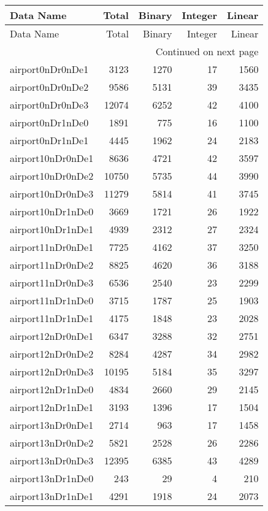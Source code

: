 \begin{longtable}{lrrrr}
\toprule
Data Name & Total & Binary & Integer & Linear \\
\midrule
\endfirsthead
\toprule
Data Name & Total & Binary & Integer & Linear \\
\midrule
\endhead
\midrule
\multicolumn{5}{r}{Continued on next page} \\
\midrule
\endfoot
\bottomrule
\endlastfoot
airport0nDr0nDe1 & 3123 & 1270 & 17 & 1560 \\
airport0nDr0nDe2 & 9586 & 5131 & 39 & 3435 \\
airport0nDr0nDe3 & 12074 & 6252 & 42 & 4100 \\
airport0nDr1nDe0 & 1891 & 775 & 16 & 1100 \\
airport0nDr1nDe1 & 4445 & 1962 & 24 & 2183 \\
airport10nDr0nDe1 & 8636 & 4721 & 42 & 3597 \\
airport10nDr0nDe2 & 10750 & 5735 & 44 & 3990 \\
airport10nDr0nDe3 & 11279 & 5814 & 41 & 3745 \\
airport10nDr1nDe0 & 3669 & 1721 & 26 & 1922 \\
airport10nDr1nDe1 & 4939 & 2312 & 27 & 2324 \\
airport11nDr0nDe1 & 7725 & 4162 & 37 & 3250 \\
airport11nDr0nDe2 & 8825 & 4620 & 36 & 3188 \\
airport11nDr0nDe3 & 6536 & 2540 & 23 & 2299 \\
airport11nDr1nDe0 & 3715 & 1787 & 25 & 1903 \\
airport11nDr1nDe1 & 4175 & 1848 & 23 & 2028 \\
airport12nDr0nDe1 & 6347 & 3288 & 32 & 2751 \\
airport12nDr0nDe2 & 8284 & 4287 & 34 & 2982 \\
airport12nDr0nDe3 & 10195 & 5184 & 35 & 3297 \\
airport12nDr1nDe0 & 4834 & 2660 & 29 & 2145 \\
airport12nDr1nDe1 & 3193 & 1396 & 17 & 1504 \\
airport13nDr0nDe1 & 2714 & 963 & 17 & 1458 \\
airport13nDr0nDe2 & 5821 & 2528 & 26 & 2286 \\
airport13nDr0nDe3 & 12395 & 6385 & 43 & 4289 \\
airport13nDr1nDe0 & 243 & 29 & 4 & 210 \\
airport13nDr1nDe1 & 4291 & 1918 & 24 & 2073 \\

\end{longtable}
